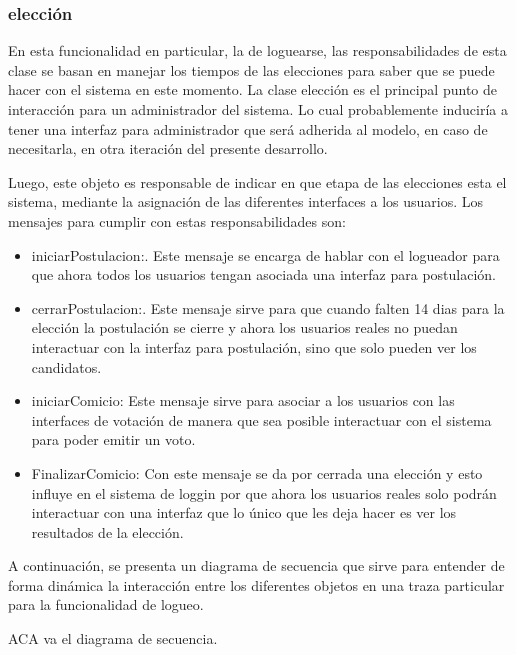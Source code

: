\subsubsection{elecci\'on}

En esta funcionalidad en particular, la de loguearse, las responsabilidades de esta clase se basan en manejar los tiempos de las elecciones para saber que se puede hacer con el sistema en este momento. La clase elecci\'on es el principal punto de interacci\'on para un administrador del sistema. Lo cual probablemente inducir\'ia a tener una interfaz para administrador que ser\'a adherida al modelo, en caso de necesitarla, en otra iteraci\'on del presente desarrollo.

Luego, este objeto es responsable de indicar en que etapa de las elecciones esta el sistema, mediante la asignaci\'on de las diferentes interfaces a los usuarios. Los mensajes para cumplir con estas responsabilidades son:

\begin{itemize}
\item iniciarPostulacion:. Este mensaje se encarga de hablar con el logueador para que ahora todos los usuarios tengan asociada una interfaz para postulaci\'on.
\item cerrarPostulacion:. Este mensaje sirve para que cuando falten 14 dias para la elecci\'on la postulaci\'on se cierre y ahora los usuarios reales no puedan interactuar con la interfaz para postulaci\'on, sino que solo pueden ver los candidatos.
\item iniciarComicio: Este mensaje sirve para asociar a los usuarios con las interfaces de votaci\'on de manera que sea posible interactuar con el sistema para poder emitir un voto.
\item FinalizarComicio: Con este mensaje se da por cerrada una elecci\'on y esto influye en el sistema de loggin por que ahora los usuarios reales solo podr\'an interactuar con una interfaz que lo \'unico que les deja hacer es ver los resultados de la elecci\'on. 
\end{itemize}




\bigskip

A continuaci\'on, se presenta un diagrama de secuencia que sirve para entender de forma din\'amica la interacci\'on entre los diferentes objetos en una traza particular para la funcionalidad de logueo.

ACA va el diagrama de secuencia.




